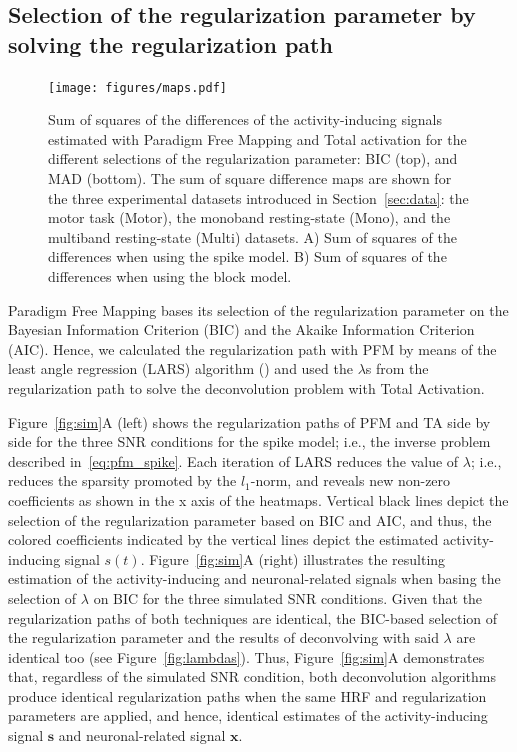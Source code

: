 \subsection{Selection of the regularization parameter by solving the regularization path}
\label{sec:regpath}

\begin{figure}[t!]
    \begin{center}
        \texttt{[image: figures/maps.pdf]}
    \end{center}
    \caption{Sum of squares of the differences of the activity-inducing signals estimated with Paradigm Free Mapping and Total activation for the different selections of the regularization parameter: BIC (top), and MAD (bottom). The sum of square difference maps are shown for the three experimental datasets introduced in Section~\ref{sec:data}: the motor task (Motor), the monoband resting-state (Mono), and the multiband resting-state (Multi) datasets. A) Sum of squares of the differences when using the spike model. B) Sum of squares of the differences when using the block model.}
\label{fig:rss}
\end{figure}

Paradigm Free Mapping bases its selection of the regularization parameter on the Bayesian Information Criterion (BIC) and the Akaike Information Criterion (AIC). Hence, we calculated the regularization path with PFM by means of the least angle regression (LARS) algorithm (\citealt{efron2004LeastAngleRegression}) and used the \(\lambda\)s from the regularization path to solve the deconvolution problem with Total Activation.

Figure~\ref{fig:sim}A (left) shows the regularization paths of PFM and TA side by side for the three SNR conditions for the spike model; i.e., the inverse problem described in~\eqref{eq:pfm_spike}. Each iteration of LARS reduces the value of \(\lambda\); i.e., reduces the sparsity promoted by the \(l_1\)-norm, and reveals new non-zero coefficients as shown in the x axis of the heatmaps. Vertical black lines depict the selection of the regularization parameter based on BIC and AIC, and thus, the colored coefficients indicated by the vertical lines depict the estimated activity-inducing signal \(s(t)\). Figure~\ref{fig:sim}A (right) illustrates the resulting estimation of the activity-inducing and neuronal-related signals when basing the selection of \(\lambda\) on BIC for the three simulated SNR conditions. Given that the regularization paths of both techniques are identical, the BIC-based selection of the regularization parameter and the results of deconvolving with said \(\lambda\) are identical too (see Figure~\ref{fig:lambdas}). Thus, Figure~\ref{fig:sim}A demonstrates that, regardless of the simulated SNR condition, both deconvolution algorithms produce identical regularization paths when the same HRF and regularization parameters are applied, and hence, identical estimates of the activity-inducing signal \(\mathbf{s}\) and neuronal-related signal \(\mathbf{x}\).

